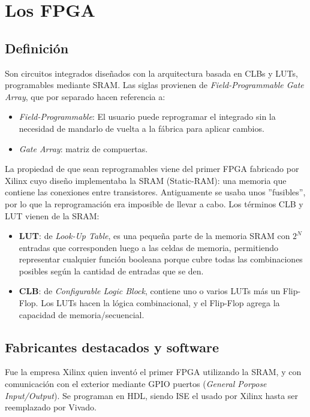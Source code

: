 \section{Los FPGA}
    \subsection{Definición}
        Son circuitos integrados diseñados con la arquitectura basada en CLBs y LUTs, programables mediante SRAM. Las siglas provienen de \textit{Field-Programmable Gate Array}, que por separado hacen referencia a:
        \begin{itemize}
            \item \textit{Field-Programmable}: El usuario puede reprogramar el integrado sin la necesidad de mandarlo de vuelta a la fábrica para aplicar cambios.
            \item \textit{Gate Array}: matriz de compuertas.
        \end{itemize}
        \sangria{} La propiedad de que sean reprogramables viene del primer FPGA fabricado por Xilinx cuyo diseño implementaba la SRAM (Static-RAM): una memoria que contiene las conexiones entre transistores. Antiguamente se usaba unos ''fusibles'', por lo que la reprogramación era imposible de llevar a cabo. Los términos CLB y LUT vienen de la SRAM:
        \begin{itemize}
            \item \textbf{LUT}: de \textit{Look-Up Table}, es una pequeña parte de la memoria SRAM con $2^N$ entradas que corresponden luego a las celdas de memoria, permitiendo representar cualquier función booleana porque cubre todas las combinaciones posibles según la cantidad de entradas que se den.\cite{harris}
            \item \textbf{CLB}: de \textit{Configurable Logic Block}, contiene uno o varios LUTs más un Flip-Flop. Los LUTs hacen la lógica combinacional, y el Flip-Flop agrega la capacidad de memoria/secuencial.
        \end{itemize}
    \subsection{Fabricantes destacados y software}
        \sangria{} Fue la empresa Xilinx quien inventó el primer FPGA utilizando la SRAM, y con comunicación con el exterior mediante GPIO puertos (\textit{General Porpose Input/Output}). Se programan en HDL, siendo ISE el usado por Xilinx hasta ser reemplazado por Vivado.
